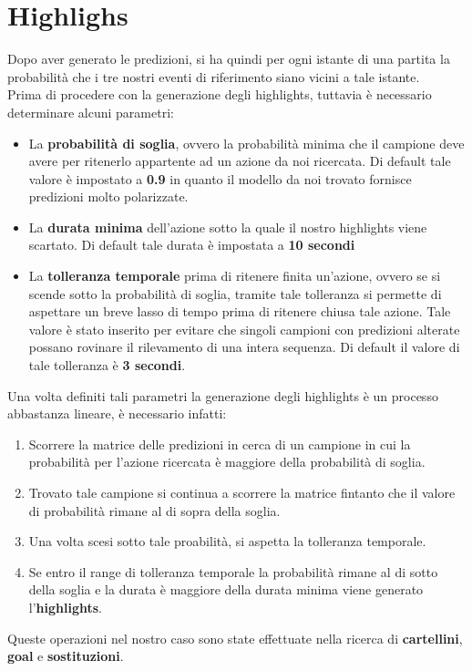 \section{Highlighs}
Dopo aver generato le predizioni, si ha quindi per ogni istante di una partita la probabilità che i tre nostri eventi di riferimento siano vicini a tale istante.
\\Prima di procedere con la generazione degli highlights, tuttavia è necessario determinare alcuni parametri:
\begin{itemize}
\item La \textbf{probabilità di soglia}, ovvero la probabilità minima che il campione deve avere per ritenerlo appartente ad un azione da noi ricercata. Di default tale valore è impostato a \textbf{0.9} in quanto il modello da noi trovato fornisce predizioni molto polarizzate.
\item La \textbf{durata minima} dell'azione sotto la quale il nostro highlights viene scartato. Di default tale durata è impostata a \textbf{10 secondi}
\item La \textbf{tolleranza temporale} prima di ritenere finita un'azione, ovvero se si scende sotto la probabilità di soglia, tramite tale tolleranza si permette di aspettare un breve lasso di tempo prima di ritenere chiusa tale azione.
Tale valore è stato inserito per evitare che singoli campioni con predizioni alterate possano rovinare il rilevamento di una intera sequenza. Di default il valore di tale tolleranza è \textbf{3 secondi}.
\end{itemize}
Una volta definiti tali parametri la generazione degli highlights è un processo abbastanza lineare, è necessario infatti:
\begin{enumerate}
\item Scorrere la matrice delle predizioni in cerca di un campione in cui la probabilità per l'azione ricercata è maggiore della probabilità di soglia.
\item Trovato tale campione si continua a scorrere la matrice fintanto che il valore di probabilità rimane al di sopra della soglia.
\item Una volta scesi sotto tale proabilità, si aspetta la tolleranza temporale.
\item Se entro il range di tolleranza temporale la probabilità rimane al di sotto della soglia e la durata è maggiore della durata minima viene generato l'\textbf{highlights}.
\end{enumerate}
Queste operazioni nel nostro caso sono state effettuate nella ricerca di \textbf{cartellini}, \textbf{goal} e \textbf{sostituzioni}.


